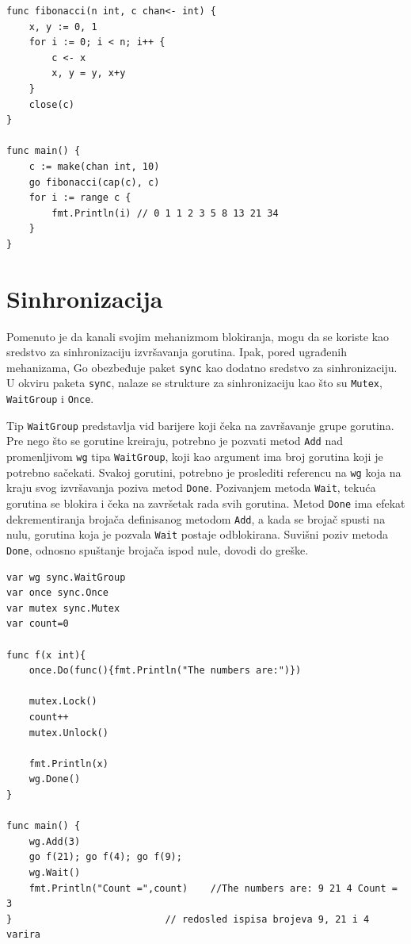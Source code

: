 \documentclass[12pt,oneside]{memoir}
\begin{document}
\begin{center}
\begin{lstlisting}[caption=Primer upotrebe jednosmernog kanala i kanala sa baferom, label={lst:chan2},  backgroundcolor=\color{background}]
func fibonacci(n int, c chan<- int) {
	x, y := 0, 1
	for i := 0; i < n; i++ {
		c <- x
		x, y = y, x+y
	}
	close(c)
}

func main() {
	c := make(chan int, 10)
	go fibonacci(cap(c), c)
	for i := range c {
		fmt.Println(i) // 0 1 1 2 3 5 8 13 21 34
	}
}
\end{lstlisting}
\end{center}

\section{Sinhronizacija}

Pomenuto je da kanali svojim mehanizmom blokiranja, mogu da se koriste kao sredstvo za sinhronizaciju izvršavanja gorutina. Ipak, pored ugrađenih mehanizama, Go obezbeđuje paket \texttt{sync} kao dodatno sredstvo za sinhronizaciju. U okviru paketa \texttt{sync}, nalaze se strukture za sinhronizaciju kao što su \texttt{Mutex}, \texttt{WaitGroup} i \texttt{Once}.

Tip \texttt{WaitGroup} predstavlja vid barijere koji čeka na završavanje grupe gorutina. Pre nego što se gorutine kreiraju, potrebno je pozvati metod \texttt{Add} nad promenljivom \texttt{wg} tipa \texttt{WaitGroup}, koji kao argument ima broj gorutina koji je potrebno sačekati. Svakoj gorutini, potrebno je proslediti referencu na \texttt{wg} koja na kraju svog izvršavanja poziva metod \texttt{Done}. Pozivanjem metoda \texttt{Wait}, tekuća gorutina se blokira i čeka na završetak rada svih gorutina.  Metod \texttt{Done} ima efekat dekrementiranja brojača definisanog metodom \texttt{Add}, a kada se brojač spusti na nulu, gorutina koja je pozvala \texttt{Wait} postaje odblokirana. Suvišni poziv metoda \texttt{Done}, odnosno spuštanje brojača ispod nule, dovodi do greške. 

\begin{center}
\begin{lstlisting}[caption=Primer upotrebe paketa \texttt{sync} za sinhronizaciju, label={lst:sync},  backgroundcolor=\color{background}]
var wg sync.WaitGroup
var once sync.Once
var mutex sync.Mutex
var count=0

func f(x int){
	once.Do(func(){fmt.Println("The numbers are:")})
	
	mutex.Lock()
	count++
	mutex.Unlock()
	
	fmt.Println(x)
	wg.Done()
}

func main() {
	wg.Add(3)
	go f(21); go f(4); go f(9);	
	wg.Wait()
	fmt.Println("Count =",count)	//The numbers are: 9 21 4 Count = 3 
}							// redosled ispisa brojeva 9, 21 i 4 varira
\end{lstlisting}
\end{center}
\end{document}
